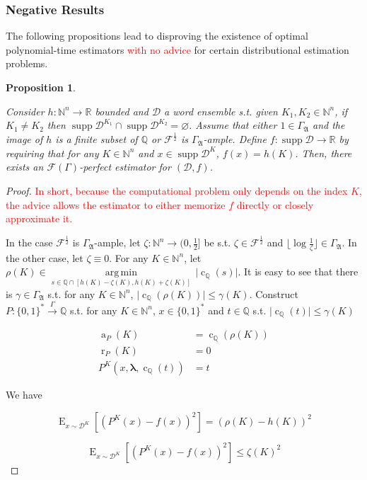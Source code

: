 \documentclass[11pt]{article}
\numberwithin{equation}{section}
\theoremstyle{definition}
\theoremstyle{plain}
\newtheorem{proposition}{Proposition}[section]
\newcommand{\Bool}{\{0,1\}}
\newcommand{\Words}{{\Bool^*}}
\DeclareMathOperator{\Supp}{supp}
\DeclareMathOperator{\E}{E}
\DeclareMathOperator{\R}{r}
\DeclareMathOperator{\A}{a}
\DeclareMathOperator{\En}{c}
\newcommand{\Argmin}[1]{\underset{#1}{\operatorname{arg\,min}}\,}
\newcommand{\Nats}{\mathbb{N}}
\newcommand{\Rats}{\mathbb{Q}}
\newcommand{\Reals}{\mathbb{R}}
\newcommand{\NatFun}{\Nats^n \rightarrow}
\newcommand{\Estr}{\bm{\lambda}}
\newcommand{\Abs}[1]{\lvert #1 \rvert}
\newcommand{\Floor}[1]{\lfloor #1 \rfloor}
\newcommand{\Dist}{\mathcal{D}}
\newcommand{\GrowA}{\Gamma_{\mathfrak{A}}}
\newcommand{\Fall}{\mathcal{F}}
\newcommand{\EG}{\Fall(\Gamma)}
\newcommand{\Scheme}{\xrightarrow{\Gamma}}
\begin{document}
\subsubsection{Negative Results}

The following propositions lead to disproving the existence of optimal polynomial-time estimators \textcolor{red}{with no advice} for certain distributional estimation problems.

\begin{samepage}
\begin{proposition}
\label{prp:tally_perfect}

Consider ${h: \Nats^n \rightarrow \Reals}$ bounded and ${\Dist}$ a word ensemble s.t. given ${K_1, K_2 \in \Nats^n}$, if ${K_1 \ne K_2}$ then ${\Supp \Dist^{K_1} \cap \Supp \Dist^{K_2} = \varnothing}$. Assume that either ${1 \in \GrowA}$ and the image of ${h}$ is a finite subset of ${\Rats}$ or ${\Fall^{\frac{1}{2}}}$ is ${\GrowA}$-ample. Define ${f: \Supp \Dist \rightarrow \Reals}$ by requiring that for any ${K \in \Nats^n}$ and ${x \in \Supp \Dist^K}$, ${f(x)=h(K)}$. Then, there exists an ${\EG}$-perfect estimator for ${(\Dist,f)}$.

\end{proposition}
\end{samepage}

\begin{proof}

\textcolor{red}{In short, because the computational problem only depends on the index $K$, the advice allows the estimator to either memorize $f$ directly or closely approximate it.}

In the case ${\Fall^{\frac{1}{2}}}$ is ${\GrowA}$-ample, let $\zeta: \NatFun (0,\frac{1}{2}]$ be s.t.  $\zeta \in \Fall^{\frac{1}{2}}$ and $\Floor{\log \frac{1}{\zeta}} \in \GrowA$. In the other case, let ${\zeta \equiv 0}$. For any $K \in \Nats^n$, let ${\rho(K) \in \Argmin{s \in \Rats \cap [h(K)-\zeta(K),h(K)+\zeta(K)]} \Abs{\En_\Rats(s)}}$. It is easy to see that there is $\gamma \in \GrowA$ s.t. for any ${K \in \Nats^n}$, ${\Abs{\En_\Rats(\rho(K))} \leq \gamma(K)}$. Construct ${P: \Words \Scheme \Rats}$ s.t. for any ${K \in \Nats^n}$, ${x \in \Words}$ and ${t \in \Rats}$ s.t. ${\Abs{\En_\Rats(t)} \leq \gamma(K)}$ 

\begin{align*}
\A_P(K) &= \En_\Rats(\rho(K)) \\
\R_P(K) &= 0 \\
P^K(x,\Estr,\En_\Rats(t)) &= t
\end{align*}

We have

\[\E_{x \sim \Dist^K}[(P^K(x)-f(x))^2] = (\rho(K)-h(K))^2\]

\[\E_{x \sim \Dist^K}[(P^K(x)-f(x))^2] \leq \zeta(K)^2\]
%
\end{proof}
\end{document}
